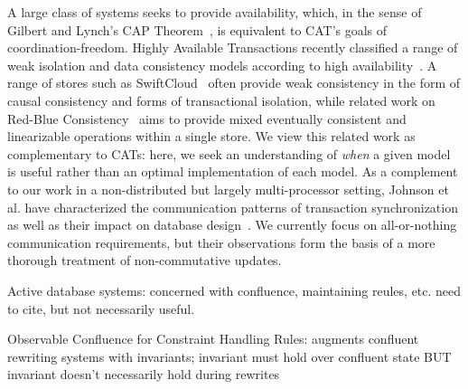  A large class of systems
seeks to provide availability, which, in the sense of Gilbert and
Lynch's CAP Theorem~\cite{gilbert-cap}, is equivalent to CAT's goals
of coordination-freedom. Highly Available Transactions recently
classified a range of weak isolation and data consistency models
according to high availability~\cite{hat-vldb}. A range of stores such
as SwiftCloud~\cite{swift} often provide weak consistency in the form
of causal consistency and forms of transactional isolation, while
related work on Red-Blue Consistency~\cite{redblue} aims to provide
mixed eventually consistent and linearizable operations within a
single store. We view this related work as complementary to CATs:
here, we seek an understanding of \textit{when} a given model is
useful rather than an optimal implementation of each model. As a
complement to our work in a non-distributed but largely
multi-processor setting, Johnson et al. have characterized the
communication patterns of transaction synchronization as well as their
impact on database design~\cite{shore-communication}. We currently
focus on all-or-nothing communication requirements, but their
observations form the basis of a more thorough treatment of
non-commutative updates.


Active database systems: concerned with confluence, maintaining
reules, etc. need to cite, but not necessarily useful.

Observable Confluence for Constraint Handling Rules: augments
confluent rewriting systems with invariants; invariant must hold over
confluent state BUT invariant doesn't necessarily hold during rewrites
